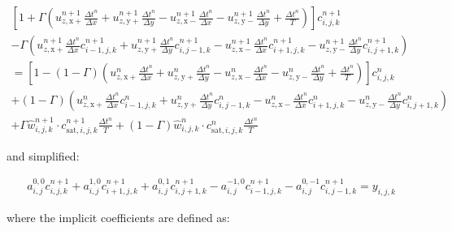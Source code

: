 \begin{multline}
  \label{eq:apx_combined_rewritten}
  \left[ 1 + \Gamma \left( 
      u^{n+1}_{z,\mathrm{x+}} \frac{\Delta t^n}{\Delta x} +
      u^{n+1}_{z,\mathrm{y+}} \frac{\Delta t^n}{\Delta y} -
      u^{n+1}_{z,\mathrm{x-}} \frac{\Delta t^n}{\Delta x} - 
      u^{n+1}_{z,\mathrm{y-}} \frac{\Delta t^n}{\Delta y} + 
      \frac{\Delta t^n}{T}
    \right)
  \right] c^{n+1}_{i,j,k} \\ -
  \Gamma \left(
    u^{n+1}_{z,\mathrm{x+}} \frac{\Delta t^n}{\Delta x} c^{n+1}_{i-1,j,k} +
    u^{n+1}_{z,\mathrm{y+}} \frac{\Delta t^n}{\Delta y} c^{n+1}_{i,j-1,k} -
    u^{n+1}_{z,\mathrm{x-}} \frac{\Delta t^n}{\Delta x} c^{n+1}_{i+1,j,k} - 
    u^{n+1}_{z,\mathrm{y-}} \frac{\Delta t^n}{\Delta y} c^{n+1}_{i,j+1,k}
  \right) \\ =
  \left[ 1 - (1 - \Gamma) \left( 
      u^n_{z,\mathrm{x+}} \frac{\Delta t^n}{\Delta x} + 
      u^n_{z,\mathrm{y+}} \frac{\Delta t^n}{\Delta y} -
      u^n_{z,\mathrm{x-}} \frac{\Delta t^n}{\Delta x} - 
      u^n_{z,\mathrm{y-}} \frac{\Delta t^n}{\Delta y} +
      \frac{\Delta t^n}{T}
    \right)
  \right] c^n_{i,j,k} \\ +
  (1 - \Gamma) \left(
    u^n_{z,\mathrm{x+}} \frac{\Delta t^n}{\Delta x} c^n_{i-1,j,k} + 
    u^n_{z,\mathrm{y+}} \frac{\Delta t^n}{\Delta y} c^n_{i,j-1,k} -
    u^n_{z,\mathrm{x-}} \frac{\Delta t^n}{\Delta x} c^n_{i+1,j,k} - 
    u^n_{z,\mathrm{y-}} \frac{\Delta t^n}{\Delta y} c^n_{i,j+1,k} 
  \right) \\ + 
  \Gamma \hat{w}^{n+1}_{i,j,k} \cdot c^{n+1}_{\mathrm{sat},i,j,k} \frac{\Delta t^n}{T} +
  (1 - \Gamma) \hat{w}^n_{i,j,k} \cdot c^n_{\mathrm{sat},i,j,k} \frac{\Delta t^n}{T}
\end{multline}

\noindent and simplified:

\begin{multline}
  \label{eq:apx_combined_simplified}
  a^{0,0}_{i,j} c^{n+1}_{i,j,k} +
  a^{1,0}_{i,j} c^{n+1}_{i+1,j,k} + 
  a^{0,1}_{i,j} c^{n+1}_{i,j+1,k} -
  a^{-1,0}_{i,j} c^{n+1}_{i-1,j,k} - 
  a^{0,-1}_{i,j} c^{n+1}_{i,j-1,k} = y_{i,j,k}
\end{multline}

\noindent where the implicit coefficients are defined as:

